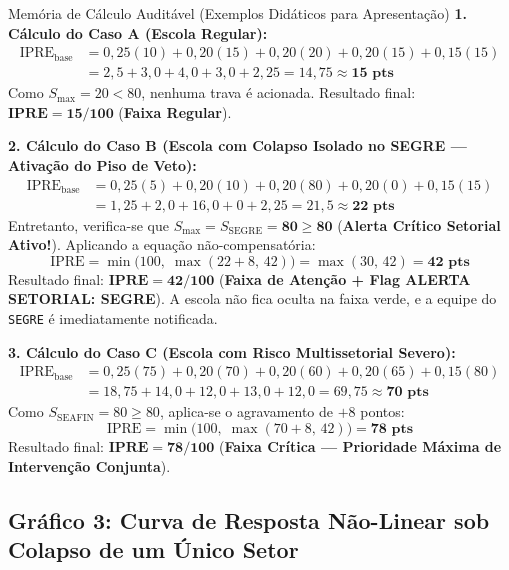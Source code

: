 \documentclass[9pt,a4paper]{extarticle}
\begin{document}
\begin{mathbox}{Memória de Cálculo Auditável (Exemplos Didáticos para Apresentação)}
\textbf{1. Cálculo do Caso A (Escola Regular):}
\begin{align*}
\text{IPRE}_{\text{base}} &= 0{,}25(10) + 0{,}20(15) + 0{,}20(20) + 0{,}20(15) + 0{,}15(15) \\
&= 2{,}5 + 3{,}0 + 4{,}0 + 3{,}0 + 2{,}25 = 14{,}75 \approx \mathbf{15\text{ pts}}
\end{align*}
Como $S_{\max} = 20 < 80$, nenhuma trava é acionada. Resultado final: $\mathbf{\text{IPRE} = 15/100}$ (\textcolor{riskOk}{\textbf{Faixa Regular}}).

\vspace{6pt}
\textbf{2. Cálculo do Caso B (Escola com Colapso Isolado no SEGRE --- Ativação do Piso de Veto):}
\begin{align*}
\text{IPRE}_{\text{base}} &= 0{,}25(5) + 0{,}20(10) + 0{,}20(80) + 0{,}20(0) + 0{,}15(15) \\
&= 1{,}25 + 2{,}0 + 16{,}0 + 0 + 2{,}25 = 21{,}5 \approx \mathbf{22\text{ pts}}
\end{align*}
Entretanto, verifica-se que $S_{\max} = S_{\text{SEGRE}} = \mathbf{80 \ge 80}$ (\textbf{Alerta Crítico Setorial Ativo!}). Aplicando a equação não-compensatória:
\[
\text{IPRE} = \min\big(100, \; \max(22 + 8, \, 42)\big) = \max(30, \, 42) = \mathbf{42\text{ pts}}
\]
Resultado final: $\mathbf{\text{IPRE} = 42/100}$ (\textcolor{riskWarn}{\textbf{Faixa de Atenção + Flag ALERTA SETORIAL: SEGRE}}). A escola não fica oculta na faixa verde, e a equipe do \texttt{SEGRE} é imediatamente notificada.

\vspace{6pt}
\textbf{3. Cálculo do Caso C (Escola com Risco Multissetorial Severo):}
\begin{align*}
\text{IPRE}_{\text{base}} &= 0{,}25(75) + 0{,}20(70) + 0{,}20(60) + 0{,}20(65) + 0{,}15(80) \\
&= 18{,}75 + 14{,}0 + 12{,}0 + 13{,}0 + 12{,}0 = 69{,}75 \approx \mathbf{70\text{ pts}}
\end{align*}
Como $S_{\text{SEAFIN}} = 80 \ge 80$, aplica-se o agravamento de $+8$ pontos:
\[
\text{IPRE} = \min\big(100, \; \max(70 + 8, \, 42)\big) = \mathbf{78\text{ pts}}
\]
Resultado final: $\mathbf{\text{IPRE} = 78/100}$ (\textcolor{riskCrit}{\textbf{Faixa Crítica --- Prioridade Máxima de Intervenção Conjunta}}).
\end{mathbox}

\subsection{Gráfico 3: Curva de Resposta Não-Linear sob Colapso de um Único Setor}
\end{document}
